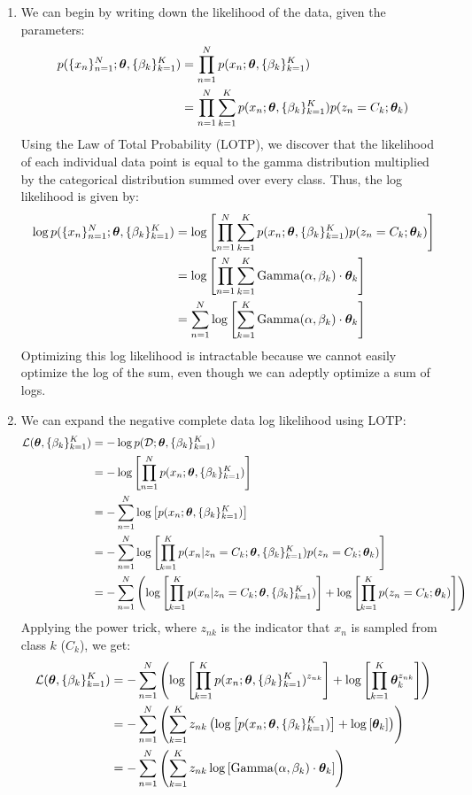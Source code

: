 \documentclass[submit]{harvardml}
\begin{document}
\begin{enumerate}
  \item We can begin by writing down the likelihood of the data, given the parameters:
  \begin{align*}
      p(\{x_n\}^N_{n=1}; \boldsymbol{\theta}, \{\beta_k\}^K_{k = 1}) &= \prod_{n=1}^N p(x_n; \boldsymbol{\theta}, \{\beta_k\}^K_{k = 1})\\
      &= \prod_{n=1}^N \sum_{k=1}^K p(x_n; \boldsymbol{\theta}, \{\beta_k\}^K_{k = 1}) p(z_n = C_k; \boldsymbol{\theta}_k)
  \end{align*}
  Using the Law of Total Probability (LOTP), we discover that the likelihood of each individual data point is equal to the gamma distribution multiplied by the categorical distribution summed over every class. Thus, the log likelihood is given by:
  \begin{align*}
      \log p(\{x_n\}^N_{n=1}; \boldsymbol{\theta}, \{\beta_k\}^K_{k = 1}) &= \log \left[\prod_{n=1}^N \sum_{k=1}^K p(x_n; \boldsymbol{\theta}, \{\beta_k\}^K_{k = 1}) p(z_n = C_k; \boldsymbol{\theta}_k)\right]\\
      &= \log \left[\prod_{n=1}^N \sum_{k=1}^K \operatorname{Gamma}(\alpha, \beta_k) \cdot \boldsymbol{\theta}_k\right]\\
      &= \sum_{n=1}^N \log \left[ \sum_{k=1}^K \operatorname{Gamma}(\alpha, \beta_k) \cdot \boldsymbol{\theta}_k\right]
  \end{align*}
  Optimizing this log likelihood is intractable because we cannot easily optimize the log of the sum, even though we can adeptly optimize a sum of logs.
  
  \item
  We can expand the negative complete data log likelihood using LOTP:
  \begin{align*}
      \mathcal{L}(\boldsymbol{\theta}, \{\beta_k\}^K_{k=1}) &=  -\log p(\mathcal D; \boldsymbol{\theta}, \{\beta_k\}^K_{k=1})\\
      &=  -\log \left[\prod_{n=1}^N p(x_n; \boldsymbol{\theta}, \{\beta_k\}^K_{k=1})\right]\\
      &=  -\sum_{n=1}^N \log \left[p(x_n; \boldsymbol{\theta}, \{\beta_k\}^K_{k=1})\right]\\
      &=  -\sum_{n=1}^N \log \left[\prod_{k=1}^K p(x_n | z_n = C_k; \boldsymbol{\theta}, \{\beta_k\}^K_{k=1}) p(z_n = C_k; \boldsymbol{\theta}_k)\right]\\
      &=  -\sum_{n=1}^N \left(\log \left[\prod_{k=1}^K p(x_n | z_n = C_k; \boldsymbol{\theta}, \{\beta_k\}^K_{k=1})\right] + \log \left[\prod_{k=1}^K p(z_n = C_k; \boldsymbol{\theta}_k)\right]\right)
  \end{align*}
  Applying the power trick, where $z_{nk}$ is the indicator that $x_n$ is sampled from class $k$ ($C_k$), we get:
  \begin{align*}
      \mathcal{L}(\boldsymbol{\theta}, \{\beta_k\}^K_{k=1}) &= -\sum_{n=1}^N \left(\log \left[\prod_{k=1}^K p(x_n; \boldsymbol{\theta}, \{\beta_k\}^K_{k=1})^{z_{nk}}\right] + \log \left[\prod_{k=1}^K\boldsymbol{\theta}_k^{z_{nk}}\right]\right)\\
      &= -\sum_{n=1}^N \left(\sum_{k=1}^K z_{nk}\left( \log \left[p(x_n; \boldsymbol{\theta}, \{\beta_k\}^K_{k=1})\right] + \log \left[\boldsymbol{\theta}_k\right]\right)\right)\\
      &= -\sum_{n=1}^N \left(\sum_{k=1}^K z_{nk}\log \left[\operatorname{Gamma}(\alpha, \beta_k) \cdot \boldsymbol{\theta}_k\right]\right)
  \end{align*}
  

\end{enumerate}
\end{document}
